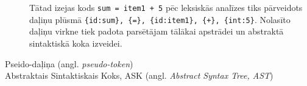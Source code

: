 \begin{description}
Tātad izejas kods \verb|sum = item1 + 5| pēc leksiskās analīzes tiks pārveidots daļiņu plūsmā \verb|{id:sum}, {=}, {id:item1}, {+}, {int:5}|. Nolasīto daļiņu virkne tiek padota parsētājam tālākai apstrādei un abstraktā sintaktiskā koka izveidei. \cite{DragonBook}

\item[Pseido-daļiņa (angl. \emph{pseudo-token})]

\item[Abstraktais Sintaktiskais Koks, ASK (angl. \emph{Abstract Syntax Tree, AST})]

\end{description}